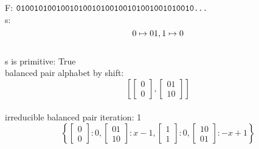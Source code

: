 F: $ \text{\texttt{0100101001001010010100100101001001010010...}}  $ \\
s: $$0 \mapsto 01\\, 1 \mapsto 0\\$$ \\
s is primitive: True  \\
balanced pair alphabet by shift: $$ \left[\begin{bmatrix}0\\ 0\end{bmatrix}, \begin{bmatrix}01\\ 10\end{bmatrix}\right] $$ \\
irreducible balanced pair iteration: 1  \\ 
$$ \left\{\begin{bmatrix}0\\ 0\end{bmatrix} : 0, \begin{bmatrix}01\\ 10\end{bmatrix} : x - 1, \begin{bmatrix}1\\ 1\end{bmatrix} : 0, \begin{bmatrix}10\\ 01\end{bmatrix} : -x + 1\right\} $$ \\
